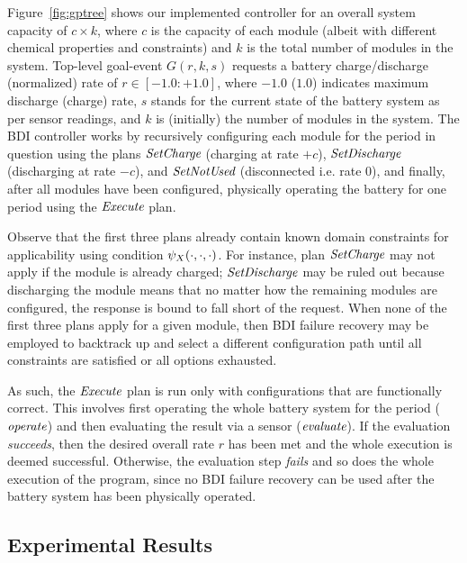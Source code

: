 Figure~\ref{fig:gptree} shows our implemented controller for an overall system capacity of $c \times k$, where $c$ is the capacity of each module (albeit with different chemical properties and constraints) and $k$ is the total number of modules in the system. Top-level goal-event $G(r,k,s)$ requests a battery charge/discharge (normalized) rate of $r \in [-1.0:+1.0]$, where $-1.0$ ($1.0$) indicates maximum discharge (charge) rate, $s$ stands for the current state of the battery system as per sensor readings, and $k$ is (initially) the number of modules in the system. 
The BDI controller works by recursively configuring each module for the period in question using the plans $\operatorname{\textit{SetCharge}}$ (charging at rate $+c$), $\operatorname{\textit{SetDischarge}}$ (discharging at rate $-c$), and $\operatorname{\textit{SetNotUsed}}$ (disconnected i.e. rate $0$), and finally, after all modules have been configured, physically operating the battery for one period using the $\operatorname{\textit{Execute}}$ plan. 

Observe that the first three plans already contain known domain constraints for applicability using condition $\psi_X(\cdot,\cdot,\cdot)$. For instance, plan $\operatorname{\textit{SetCharge}}$ may not apply if the module is already charged; $\operatorname{\textit{SetDischarge}}$ may be ruled out because discharging the module means that no matter how the remaining modules are configured, the response is bound to fall short of the request. When none of the first three plans apply for a given module, then BDI failure recovery may be employed to backtrack up and select a different configuration path until all constraints are satisfied or all options exhausted. 

As such, the $\operatorname{\textit{Execute}}$ plan is run only with configurations that are functionally correct. This involves first operating the whole battery system for the period ($\operatorname{\textit{operate}}$) and then evaluating the result via a sensor ($\operatorname{\textit{evaluate}}$). If the evaluation \emph{succeeds}, then the desired overall rate $r$ has been met and the whole execution is deemed successful. Otherwise, the evaluation step \emph{fails} and so does the whole execution of the program, since no BDI failure recovery can be used after the battery system has been physically operated. 


\subsection{Experimental Results}\label{sec:results}

